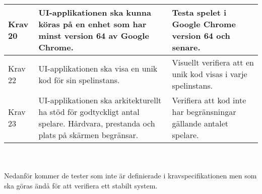 \documentclass[10pt]{article}
\begin{document}
\begin{tabular}{| p{1.5cm} | p{6cm} | p{8cm}|}
		\hline
		Krav 20& UI-applikationen ska kunna köras på en enhet som har minst version 64 av Google Chrome. &Testa spelet i Google Chrome version 64 och senare. \\
		\hline
		Krav 22& UI-applikationen ska visa en unik kod för sin spelinstans. &Visuellt verifiera att en unik kod visas i varje spelinstans.\\
		\hline
		Krav 23& UI-applikationen ska arkitekturellt ha stöd för godtyckligt antal spelare. Hårdvara, prestanda och plats på skärmen begränsar. &Verifiera att kod inte har begränsningar gällande antalet spelare. \\
		\hline


   
  \end{tabular}
	\\ \\
	Nedanför kommer de tester som inte är definierade i kravspecifikationen \cite{bib-kravspec} men som ska göras ändå för att verifiera ett stabilt system.
	
\end{document}
